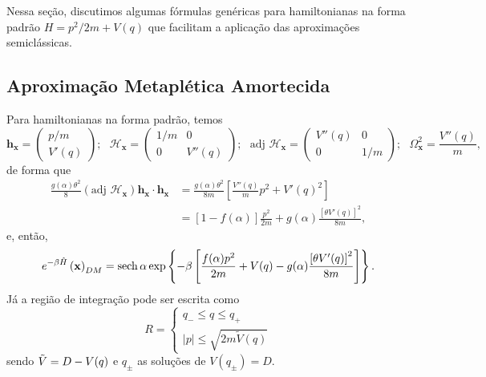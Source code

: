 \documentclass[
	12pt,
	oneside,			%
	a4paper,			%
	english,			%
	brazil				%
	]{abntex2}
\theoremstyle{definition}
\begin{document}
Nessa seção, discutimos algumas fórmulas genéricas para hamiltonianas na forma padrão $H = p^2/2m + V(q)$ que facilitam a aplicação das aproximações semiclássicas.

\subsection{Aproximação Metaplética Amortecida}

Para hamiltonianas na forma padrão, temos
\begin{equation}
\label{Aproximação Metaplética Amortecida padrão}
    \mathbf{h}_{\mathbf{x}} = \begin{pmatrix} p/m \\ V'(q) \end{pmatrix}; \ \ \ \boldsymbol{\mathcal{H}}_{\mathbf{x}} = \begin{pmatrix} 1/m & 0 \\ 0 & V''(q) \end{pmatrix};  \ \ \ \text{adj } \boldsymbol{\mathcal{H}}_{\mathbf{x}} = \begin{pmatrix} V''(q) & 0  \\ 0 & 1/m \end{pmatrix}; \ \ \ \Omega_\mathbf{x}^2 = \frac{V''(q)}{m},
\end{equation}
de forma que
\begin{equation}
    \begin{aligned}
        \frac{g(\alpha) \theta^2}{8} \left( \text{adj } \boldsymbol{\mathcal{H}}_\mathbf{x} \right) \mathbf{h}_\mathbf{x} \cdot \mathbf{h}_\mathbf{x} &= \frac{g(\alpha) \theta^2}{8m} \left[ \frac{V''(q)}{m}p^2 + V'(q)^2 \right] \\ &= \left[1-f(\alpha)\right] \frac{p^2}{2m} + g(\alpha) \frac{{\left[\theta V'(q) \right]}^2}{8m},
    \end{aligned}
\end{equation}
e, então,
\begin{equation}
    e^{-\beta \hat{H}} \left( \mathbf{x}\right)_{DM} =  \sech \alpha  \exp \left\{ -\beta \left[ \frac{f(\alpha)p^2}{2m} +V(q) - g(\alpha) \frac{{\left[\theta V'(q) \right]}^2}{8m} \right] \right\}.
\end{equation}
Já a região de integração pode ser escrita como
\begin{equation}
    R = \begin{cases}
        q_- \le q \le q_+ \\
        |p| \le \sqrt{2m \tilde{V}(q)}
    \end{cases}
\end{equation}
sendo $\Tilde{V} = D - V(q)$ e $q_{\pm}$ as soluções de $V(q_{\pm}) = D$.
\end{document}
